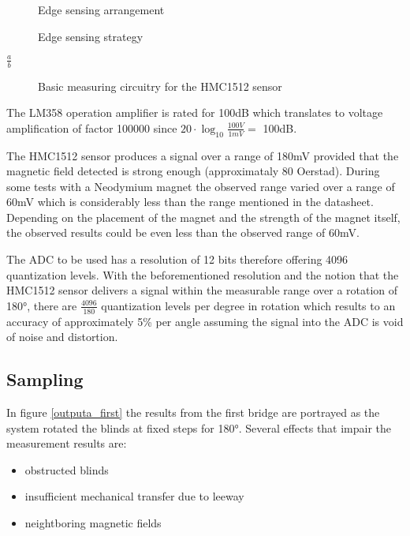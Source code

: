 \documentclass[]{article}
\begin{document}
\begin{figure}[h!]
  \centering
  
  \caption{Edge sensing arrangement}
  \label{fig:edgesense}
\end{figure}

\begin{figure}[h!]
  \def\svgwidth{350pt}
  
  \caption{Edge sensing strategy}
  \label{fig:edgestrategy}
\end{figure}

$\frac{a}{b}$
\begin{figure}[hbt]
	
	\centerline{\box\graph}
	\caption{Basic measuring circuitry for the HMC1512 sensor}
	\label{symlabelforquick}
\end{figure}

The LM358 operation amplifier is rated for \si{100}{dB} which translates to 
voltage amplification of factor 100000 since $20\cdot\log_{10}{\frac{\si{100}{V}}{\si{1}{mV}}}= $ \si{100}{dB}.

The HMC1512 sensor produces a signal over a range of \si{180}{mV} provided that 
the magnetic field detected is strong enough (approximataly 80 Oerstad). During
some tests with a Neodymium magnet the observed range varied over a range of 
\si{60}{mV} which is considerably less than the range mentioned in the 
datasheet. Depending on the placement of the magnet and the strength of the 
magnet itself, the observed results could be even less than the observed range 
of \si{60}{mV}.

The ADC to be used has a resolution of 12 bits therefore offering 4096 
quantization levels. With the beforementioned resolution and the notion that 
the HMC1512 sensor delivers a signal within the measurable range over a 
rotation of \ang{180}, there are $\frac{4096}{180}$ quantization levels per 
degree in rotation which results to an accuracy of approximately 5\% per angle 
assuming the signal into the ADC is void of noise and distortion.



\subsection{Sampling}
In figure \ref{outputa_first} the results from the first bridge are 
portrayed as the system rotated the blinds at fixed steps for \ang{180}. 
Several effects that impair the measurement results are:
\begin{itemize}
  \item obstructed blinds
  \item insufficient mechanical transfer due to leeway
  \item neightboring magnetic fields
\end{itemize}
\end{document}
